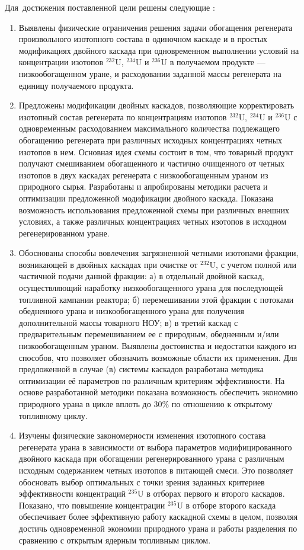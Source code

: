 Для~достижения поставленной цели решены следующие {\tasks}:
\begin{enumerate}[leftmargin=0.5cm]
  \item Выявлены физические ограничения решения задачи обогащения регенерата произвольного изотопного состава в одиночном каскаде и в простых модификациях двойного каскада при одновременном выполнении условий на концентрации изотопов $^{232}$U, $^{234}$U и $^{236}$U в получаемом продукте --- низкообогащенном уране, и расходовании заданной массы регенерата на единицу получаемого продукта.
  \item Предложены модификации двойных каскадов, позволяющие корректировать изотопный состав регенерата по концентрациям изотопов $^{232}$U, $^{234}$U и $^{236}$U с одновременным расходованием максимального количества подлежащего обогащению регенерата при различных исходных концентрациях четных изотопов в нем. Основная идея схемы состоит в том, что товарный продукт получают смешиванием обогащенного и частично очищенного от четных изотопов в двух каскадах регенерата с низкообогащенным ураном из природного сырья. Разработаны и апробированы методики расчета и оптимизации предложенной модификации двойного каскада. Показана возможность использования предложенной схемы при различных внешних условиях, а также различных концентрациях четных изотопов в исходном регенерированном уране.
  \item Обоснованы способы вовлечения загрязненной четными изотопами фракции, возникающей в двойных каскадах при очистке от $^{232}$U, с учетом полной или частичной подачи данной фракции: а) в отдельный двойной каскад, осуществляющий наработку низкообогащенного урана для последующей топливной кампании реактора; б) перемешивании этой фракции с потоками обедненного урана и низкообогащенного урана для получения дополнительной массы товарного НОУ; в) в третий каскад с предварительным перемешиванием ее с природным, обедненным и/или низкообогащенным ураном. Выявлены достоинства и недостатки каждого из способов, что позволяет обозначить возможные области их применения. Для предложенной в случае (в) системы каскадов разработана методика оптимизации её параметров по различным критериям эффективности. На основе разработанной методики показана возможность обеспечить экономию природного урана в цикле вплоть до 30\% по отношению к открытому топливному циклу.
  \item Изучены физические закономерности изменения изотопного состава регенерата урана в зависимости от выбора параметров модифицированного двойного каскада при обогащении регенерированного урана с различным исходным содержанием четных изотопов в питающей смеси. Это позволяет обосновать выбор оптимальных с точки зрения заданных критериев эффективности концентраций $^{235}$U в отборах первого и второго каскадов. Показано, что повышение концентрации $^{235}$U в отборе второго каскада обеспечивает более эффективную работу каскадной схемы в целом, позволяя достичь одновременной экономии природного урана и работы разделения по сравнению с открытым ядерным топливным циклом.

\end{enumerate}
